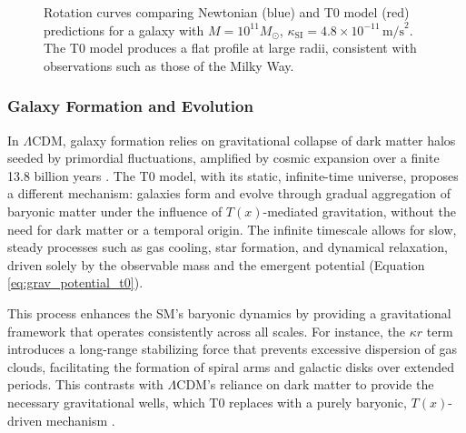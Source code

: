 \documentclass[12pt,a4paper]{article}
\newcommand{\Tfield}{T(x)}
\begin{document}
	\begin{figure}[h]
		\centering
		\caption{Rotation curves comparing Newtonian (blue) and T0 model (red) predictions for a galaxy with \(M = 10^{11} M_{\odot}\), \(\kappa_{\text{SI}} = 4.8 \times 10^{-11} \, \text{m/s}^2\). The T0 model produces a flat profile at large radii, consistent with observations such as those of the Milky Way.}
		\label{fig:rotation_curves}
	\end{figure}
	
	\subsubsection{Galaxy Formation and Evolution}
	In \(\Lambda\)CDM, galaxy formation relies on gravitational collapse of dark matter halos seeded by primordial fluctuations, amplified by cosmic expansion over a finite 13.8 billion years \cite{Planck2020}. The T0 model, with its static, infinite-time universe, proposes a different mechanism: galaxies form and evolve through gradual aggregation of baryonic matter under the influence of \(\Tfield\)-mediated gravitation, without the need for dark matter or a temporal origin. The infinite timescale allows for slow, steady processes such as gas cooling, star formation, and dynamical relaxation, driven solely by the observable mass and the emergent potential (Equation \ref{eq:grav_potential_t0}).
	
	This process enhances the SM’s baryonic dynamics by providing a gravitational framework that operates consistently across all scales. For instance, the \(\kappa r\) term introduces a long-range stabilizing force that prevents excessive dispersion of gas clouds, facilitating the formation of spiral arms and galactic disks over extended periods. This contrasts with \(\Lambda\)CDM’s reliance on dark matter to provide the necessary gravitational wells, which T0 replaces with a purely baryonic, \(\Tfield\)-driven mechanism \cite{pascher_galaxies_2025}.
	
\end{document}
